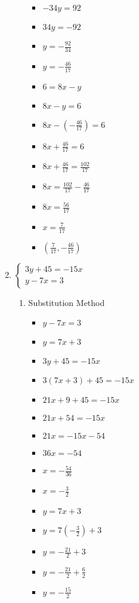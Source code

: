 \documentclass{article}
\begin{document}
\begin{enumerate}
\begin{enumerate}
\begin{itemize}
    \item $-34y=92$
    \item $34y=-92$
    \item {\Large $y=-\frac{92}{34}$}
    \item {\Large $y=-\frac{46}{17}$}
    \item $6=8x-y$
    \item $8x-y=6$
    \item {\Large $8x-\left(-\frac{46}{17}\right)=6$}
    \item {\Large $8x+\frac{46}{17}=6$}
    \item {\Large $8x+\frac{46}{17}=\frac{102}{17}$}
    \item {\Large $8x=\frac{102}{17}-\frac{46}{17}$}
    \item {\Large $8x=\frac{56}{17}$}
    \item {\Large $x=\frac{7}{17}$}
    \item {\Large $\left(\frac{7}{17},-\frac{46}{17}\right)$}
    \end{itemize}
  \end{enumerate}
\item $\left\{ \begin{array}{l}
      3y+45=-15x \\
      y-7x=3 \end{array} \right.$
  \begin{enumerate}
  \item Substitution Method
    \begin{itemize}
    \item $y-7x=3$
    \item $y=7x+3$
    \item $3y+45=-15x$
    \item $3(7x+3)+45=-15x$
    \item $21x+9+45=-15x$
    \item $21x+54=-15x$
    \item $21x=-15x-54$
    \item $36x=-54$
    \item {\Large $x=-\frac{54}{36}$}
    \item {\Large $x=-\frac{3}{2}$}
    \item $y=7x+3$
    \item {\Large $y=7\left(-\frac{3}{2}\right)+3$}
    \item {\Large $y=-\frac{21}{2}+3$}
    \item {\Large $y=-\frac{21}{2}+\frac{6}{2}$}
    \item {\Large $y=-\frac{15}{2}$}

\end{itemize}
\end{enumerate}
\end{enumerate}
\end{document}
